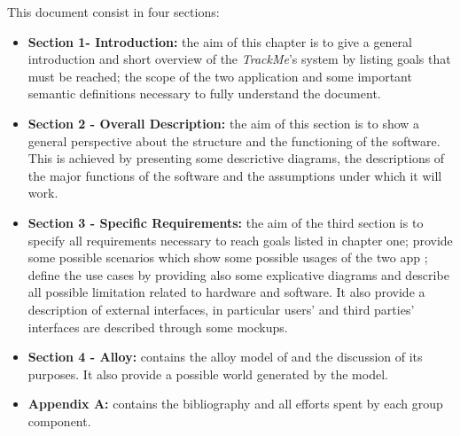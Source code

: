 This document consist in four sections:\par
\begin{itemize}
	\item \textbf{Section 1- Introduction:} the aim of this chapter is to give a general introduction and short overview of the \textit{TrackMe}'s system by listing goals that must be reached; the scope of the two application and some important semantic definitions necessary to 			fully understand the document.  
	\item \textbf{Section 2 - Overall Description:} the aim of this section is to show a general perspective about the structure and the functioning of the software. This is achieved by presenting some descrictive diagrams, the descriptions of the major functions of the software and the assumptions under which it will work.
	\item \textbf{Section 3 - Specific Requirements:} the aim of the third section is to specify all requirements necessary to reach goals listed in chapter one; provide some possible scenarios which show some possible usages of the two app ; define the use cases by providing also 		some explicative diagrams and describe all possible limitation related to hardware and software. It also provide a description of external interfaces, in particular users' and third parties' interfaces are described through some mockups.
	\item \textbf{Section 4 - Alloy:} contains the alloy model of and the discussion of its purposes. It also provide a possible world generated by the model.
	\item \textbf{Appendix A:} contains the bibliography and all efforts spent by each group component. 
\end{itemize}
